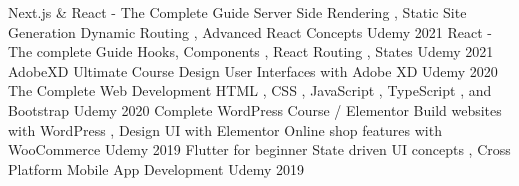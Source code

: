 
\begin{cvhonors}
\cvhonor
  {Next.js \& React - The Complete Guide} %
  {Server Side Rendering , Static Site Generation \newline Dynamic Routing , Advanced React Concepts} %
  {Udemy} %
  {2021} %
\cvhonor
  {React - The complete Guide} %
  {Hooks, Components , React Routing , States} %
  {Udemy} %
  {2021} %
\cvhonor
  {AdobeXD Ultimate Course} %
  {Design User Interfaces with Adobe XD} %
  {Udemy} %
  {2020} %
\cvhonor
  {The Complete Web Development} %
  {HTML , CSS , JavaScript , TypeScript , and Bootstrap} %
  {Udemy} %
  {2020} %
\cvhonor
  {Complete WordPress Course / Elementor} %
  {Build websites with WordPress , Design UI with Elementor \newline Online shop features with WooCommerce} %
  {Udemy} %
  {2019} %
\cvhonor
  {Flutter for beginner} %
  {State driven UI concepts , Cross Platform Mobile App Development} %
  {Udemy} %
  {2019} %
\end{cvhonors}
